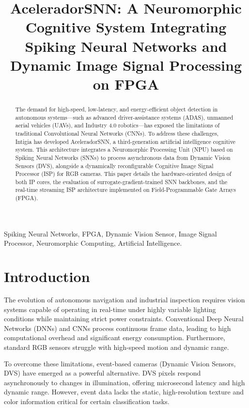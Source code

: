 \documentclass[conference]{IEEEtran}
\begin{document}
\title{AceleradorSNN: A Neuromorphic Cognitive System Integrating Spiking Neural Networks and Dynamic Image Signal Processing on FPGA}

\author{
}

\maketitle

\begin{abstract}
The demand for high-speed, low-latency, and energy-efficient object detection in autonomous systems—such as advanced driver-assistance systems (ADAS), unmanned aerial vehicles (UAVs), and Industry 4.0 robotics—has exposed the limitations of traditional Convolutional Neural Networks (CNNs). To address these challenges, Intigia has developed AceleradorSNN, a third-generation artificial intelligence cognitive system. This architecture integrates a Neuromorphic Processing Unit (NPU) based on Spiking Neural Networks (SNNs) to process asynchronous data from Dynamic Vision Sensors (DVS), alongside a dynamically reconfigurable Cognitive Image Signal Processor (ISP) for RGB cameras. This paper details the hardware-oriented design of both IP cores, the evaluation of surrogate-gradient-trained SNN backbones, and the real-time streaming ISP architecture implemented on Field-Programmable Gate Arrays (FPGA).
\end{abstract}

\begin{IEEEkeywords}
Spiking Neural Networks, FPGA, Dynamic Vision Sensor, Image Signal Processor, Neuromorphic Computing, Artificial Intelligence.
\end{IEEEkeywords}

\section{Introduction}
The evolution of autonomous navigation and industrial inspection requires vision systems capable of operating in real-time under highly variable lighting conditions while maintaining strict power constraints. Conventional Deep Neural Networks (DNNs) and CNNs process continuous frame data, leading to high computational overhead and significant energy consumption. Furthermore, standard RGB sensors struggle with high-speed motion and dynamic range. 

To overcome these limitations, event-based cameras (Dynamic Vision Sensors, DVS) have emerged as a powerful alternative. DVS pixels respond asynchronously to changes in illumination, offering microsecond latency and high dynamic range. However, event data lacks the static, high-resolution texture and color information critical for certain classification tasks. 
\end{document}

